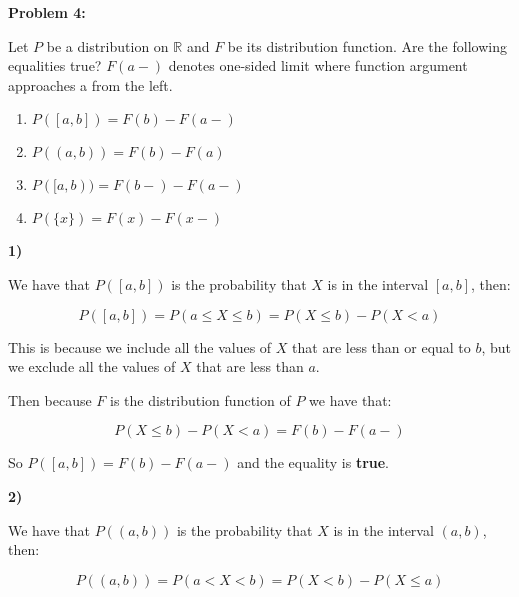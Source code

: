 \textbf{Problem 4:}

\singlespacing

Let $P$ be a distribution on $\mathbb{R}$ and $F$ be its distribution function. Are
the following equalities true? $F(a-)$ denotes one-sided limit where function argument
approaches a from the left.

\begin{enumerate}
    \item $P([a, b]) = F(b) - F(a -)$
    \item $P((a, b)) = F(b) - F(a)$
    \item $P([a, b)) = F(b -) - F(a -)$
    \item $P(\{x\}) = F(x) - F(x -)$
\end{enumerate}


\textbf{1)}

\singlespacing

We have that $P([a, b])$ is the probability that $X$ is in the interval $[a, b]$, then:

\singlespacing

\begin{equation}
    P([a, b]) = P(a \leq X \leq b) = P(X \leq b) - P(X < a)
\end{equation}

\singlespacing

This is because we include all the values of $X$ that are less than or equal to $b$,
but we exclude all the values of $X$ that are less than $a$.

\singlespacing

Then because $F$ is the distribution function of $P$ we have that:

\singlespacing

\begin{equation}
    P(X \leq b) - P(X < a) = F(b) - F(a -)
\end{equation}

\singlespacing

So $P([a, b]) = F(b) - F(a -)$ and the equality is \textbf{true}.

\singlespacing
\singlespacing
\singlespacing

\textbf{2)}

\singlespacing

We have that $P((a, b))$ is the probability that $X$ is in the interval $(a, b)$, then:

\singlespacing

\begin{equation}
    P((a, b)) = P(a < X < b) = P(X < b) - P(X \leq a)
\end{equation}

